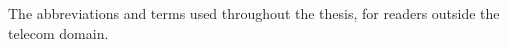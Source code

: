 \documentclass[english,twoside,openright,a4paper,censored,csm,software-track-2020]{HYthesisML}
\begin{document}



\cleardoublepage %

\printbibliography

\backmatter
\begin{appendices}

The abbreviations and terms used throughout the thesis, for readers outside the telecom domain.


\end{appendices}
\end{document}
